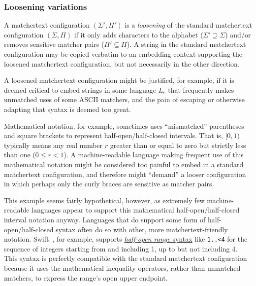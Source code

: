 \subsubsection{Loosening variations}

A matchertext configuration $(\Sigma',\Pi')$
is a \emph{loosening} of
the standard matchertext configuration $(\Sigma,\Pi)$
if it only adds characters to the alphabet ($\Sigma' \supseteq \Sigma$)
and/or removes sensitive matcher pairs ($\Pi' \subseteq \Pi$).
A string in the standard matchertext configuration
may be copied verbatim to an embedding context
supporting the loosened matchertext configuration,
but not necessarily in the other direction.

A loosened matchertext configuration might be justified,
for example, if it is deemed critical to embed strings in some language $L_e$
that frequently makes unmatched uses of some ASCII matchers,
and the pain of escaping or otherwise adapting that syntax is deemed too great.

Mathematical notation, for example,
sometimes uses
``mismatched'' parentheses and square brackets
to represent half-open/half-closed intervals.
That is,
$[0,1)$ typically means any real number $r$ greater than or equal to zero
but strictly less than one ($0 \le r < 1$).
A machine-readable language making frequent use of this mathematical notation
might be considered too painful to embed
in a standard matchertext configuration,
and therefore might ``demand'' a looser configuration
in which perhaps only the curly braces are sensitive as matcher pairs.

This example seems fairly hypothetical, however,
as extremely few machine-readable languages
appear to support this mathematical
half-open/half-closed interval notation anyway.
Languages that do support some form of half-open/half-closed syntax
often do so with other, more matchertext-friendly notation.
Swift~\cite{apple22swift}, for example,
supports \href{https://docs.swift.org/swift-book/LanguageGuide/BasicOperators.html#ID73}{\emph{half-open range} syntax} like \verb|1..<4|
for the sequence of integers starting from and including 1,
up to but not including 4.
This syntax is perfectly compatible with the standard matchertext configuration
because it uses the mathematical inequality operators,
rather than unmatched matchers,
to express the range's open upper endpoint.

